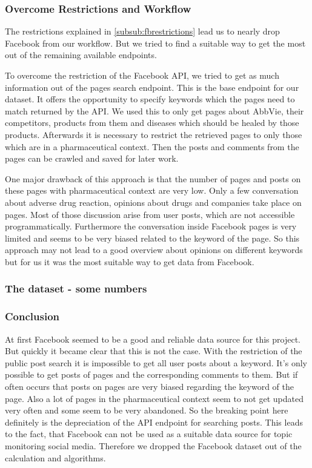 \documentclass[11pt,titlepage,oneside,openany]{book}
\begin{document}
\subsubsection{Overcome Restrictions and Workflow}

The restrictions explained in \ref{subsub:fbrestrictions} lead us to nearly drop Facebook from our workflow. But we tried to find a suitable way to get the most out of the remaining available endpoints. \par
\noindent To overcome the restriction of the Facebook API, we tried to get as much information out of the pages search endpoint. This is the base endpoint for our dataset. It offers the opportunity to specify keywords which the pages need to match returned by the API. We used this to only get pages about AbbVie, their competitors, products from them and diseases which should be healed by those products. Afterwards it is necessary to restrict the retrieved pages to only those which are in a pharmaceutical context. Then the posts and comments from the pages can be crawled and saved for later work.\par
\noindent One major drawback of this approach is that the number of pages and posts on these pages with pharmaceutical context are very low. Only a few conversation about adverse drug reaction, opinions about drugs and companies take place on pages. Most of those discussion arise from user posts, which are not accessible programmatically. Furthermore the conversation inside Facebook pages is very limited and seems to be very biased related to the keyword of the page.
So this approach may not lead to a good overview about opinions on different keywords but for us it was the most suitable way to get data from Facebook.





\subsubsection{The dataset - some numbers}
\subsubsection{Conclusion}
At first Facebook seemed to be a good and reliable data source for this project. But quickly it became clear that this is not the case. With the restriction of the public post search it is impossible to get all user posts about a keyword. It’s only possible to get posts of pages and the corresponding comments to them. But if often occurs that posts on pages are very biased regarding the keyword of the page. Also a lot of pages in the pharmaceutical context seem to not get updated very often and some seem to be very abandoned. So the breaking point here definitely is the depreciation of the API endpoint for searching posts. This leads to the fact, that Facebook can not be used as a suitable data source for topic monitoring social media. Therefore we dropped the Facebook dataset out of the calculation and algorithms.
\end{document}
